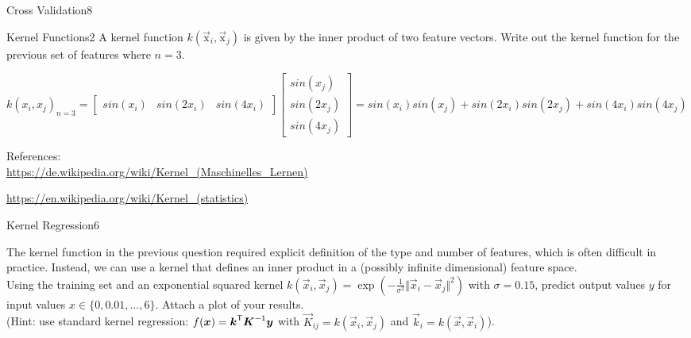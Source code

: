 \begin{questions}
\begin{question}{Cross Validation}{8}
\begin{answer}

	
	\end{answer}
	\end{question}
	
	
	
	
	
	\begin{question}{Kernel Functions}{2}
		A kernel function $k(\vec{\mbox{x}}_{i},\vec{\mbox{x}}_{j})$ is given by the inner product of two feature vectors. Write out the kernel function for the previous set of features where $n=3$.
		
	\begin{answer}
	
		$k(x_i,x_j)_{n=3}=\begin{bmatrix}
		sin(x_i)&sin(2x_i)&sin(4x_i)
		\end{bmatrix}
		\begin{bmatrix}
			sin(x_j)\\sin(2x_j)\\sin(4x_j)
		\end{bmatrix}=sin(x_i)sin(x_j)+sin(2x_i)sin(2x_j)+sin(4x_i)sin(4x_j)$

	References:\\
	\hyperlink{https://de.wikipedia.org/wiki/Kernel\_(Maschinelles\_Lernen)}{https://de.wikipedia.org/wiki/Kernel\_(Maschinelles\_Lernen)}
	
	\hyperlink{https://en.wikipedia.org/wiki/Kernel\_(statistics)}{		https://en.wikipedia.org/wiki/Kernel\_(statistics)}
	

	\end{answer}
	\end{question}
	
	
	
	\begin{question}{Kernel Regression}{6}
		
		The kernel function in the previous question required explicit definition of the type and number of features, which is often difficult in practice. Instead, we can use a kernel that defines an inner product in a (possibly infinite dimensional) feature space. \\
		Using the training set and an exponential squared kernel 		$k( \vec{x}_{i} , \vec{x}_{j} )= \exp ( -\frac{1}{\sigma^{2}} \Vert \vec{x}_{i}-\vec{x}_{j}\Vert ^{2} )$ with $\sigma=0.15$, predict output values $y$ for input values $x\in\{0,0.01,\ldots,6\}$. Attach a plot of your results.
		\\
		(Hint: use standard kernel regression: $f(\mbox{\ensuremath{{\boldsymbol{x}}}})={\boldsymbol{k}}^\mathsf{T}{\boldsymbol{K}}^{-1}{\boldsymbol{y}}$ with $\vec{K}_{ij}=k(\vec{x}_{i},\vec{x}_{j})$ and $\vec{k}_{i}=k(\vec{x},\vec{x}_{i})$).
		

\end{question}
\end{questions}
